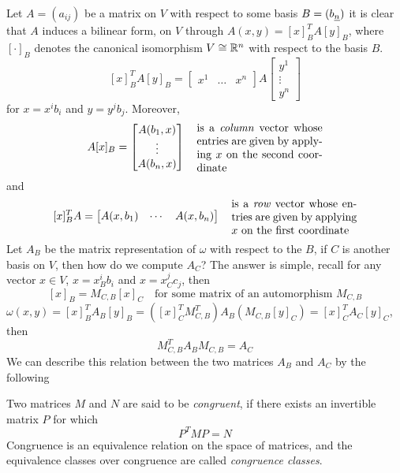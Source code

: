 \documentclass[../main-v2-manifolds.tex]{subfiles}
\begin{document}
    Let $A = (a_{ij})$ be a matrix on $V$ with respect to some basis $B = (\Ul{b}[n])$ it is clear that $A$ induces a bilinear form, on $V$ through $A(x,y) = [x]_B^TA[y]_B$, where $[\cdot]_B$ denotes the canonical isomorphism $V\cong {\mathbb{R}^n}$ with respect to the basis $B$.
    \[
        [x]_B^T A [y]_B = \begin{bmatrix}
            x^1 &\ldots & x^n
        \end{bmatrix}A \begin{bmatrix}
            y^1\\
            \vdots\\
            y^n
        \end{bmatrix}
    \]
    for $x = x^ib_i$ and $y = y^jb_j$. Moreover,
    \[
        A[x]_B = \begin{bmatrix}
            A(b_1,x)\\
            \vdots\\
            A(b_n,x)
        \end{bmatrix}\quad \parbox{4cm}{is a \emph{column} vector whose entries are given by applying $x$ on the second coordinate}
    \]
    and 
    \[
        [x]_B^T A = \begin{bmatrix}
            A(x,b_1) & \cdots & A(x, b_n)
        \end{bmatrix}\quad\parbox{4cm}{is a \emph{row} vector whose entries are given by applying $x$ on the first coordinate}
    \]
    Let $A_B$ be the matrix representation of $\omega$ with respect to the $B$, if $C$ is another basis on $V$, then how do we compute $A_C$? The answer is simple, recall for any vector $x\in V$, $x = x^i_Bb_i$ and $x = x^j_C c_j$, then
    \[
        [x]_B = M_{C,B}[x]_C\quad\text{for some matrix of an automorphism }M_{C,B}
    \]
    $\omega(x,y) = [x]_B^TA_B[y]_B = ([x]_C^TM_{C,B}^T)A_B(M_{C,B}[y]_C) = [x]_C^T A_C [y]_C$, then
    \begin{equation}\label{lee-chp22:congruent-matrices}
        M^T_{C,B}A_BM_{C,B} = A_C
    \end{equation}
    We can describe this relation between the two matrices $A_B$ and $A_C$ by the following
    \begin{definition}
        Two matrices $M$ and $N$ are said to be \emph{congruent}, if there exists an invertible matrix $P$ for which
        \[
            P^TMP = N
        \]
        Congruence is an equivalence relation on the space of matrices, and the equivalence classes over congruence are called \emph{congruence classes}.
    \end{definition}
\end{document}
